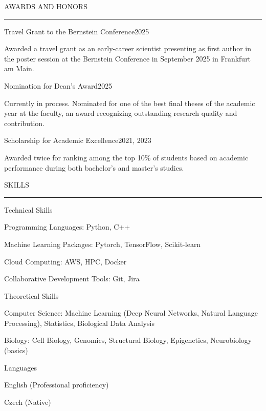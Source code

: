 \documentclass{resume} %
\renewenvironment{rSection}[1]{
\sectionskip
\textcolor{CarnegieMellonRed}{\MakeUppercase{#1}}
\sectionlineskip
\hrule
\begin{list}{}{
\setlength{\leftmargin}{1.5em}
}
\item[]
}{
\end{list}
}
\begin{document}

\begin{rSection}{Awards and Honors} \itemsep -2pt

\begin{rProject}{\large Travel Grant to the Bernstein Conference}{2025}{}{}
    \item Awarded a travel grant as an early-career scientist presenting as first author in the poster session at the Bernstein Conference in September 2025 in Frankfurt am Main.
\end{rProject}

\begin{rProject}{\large Nomination for Dean's Award}{2025}{}{}
    \item Currently in process. Nominated for one of the best final theses of the academic year at the faculty, an award recognizing outstanding research quality and contribution.
\end{rProject}

\begin{rProject}{Scholarship for Academic Excellence}{2021, 2023}{}{}
    \item Awarded twice for ranking among the top 10\% of students based on academic performance during both bachelor's and master's studies.
\end{rProject}

\end{rSection}


\begin{rSection}{Skills} \itemsep -2pt
\begin{rProject}{Technical Skills}{}{}{}
    \item Programming Languages: Python, C++
    \item Machine Learning Packages: Pytorch, TensorFlow, Scikit-learn
    \item Cloud Computing: AWS, HPC, Docker
    \item Collaborative Development Tools: Git, Jira
\end{rProject}
\begin{rProject}{Theoretical Skills}{}{}{}
    \item Computer Science: Machine Learning (Deep Neural Networks, Natural Language Processing), Statistics, Biological Data Analysis
    \item Biology: Cell Biology, Genomics, Structural Biology, Epigenetics, Neurobiology (basics)
\end{rProject}
\begin{rProject}{Languages}{}{}{}
    \item English (Professional proficiency)
    \item Czech (Native)
\end{rProject}
\end{rSection}
\end{document}

